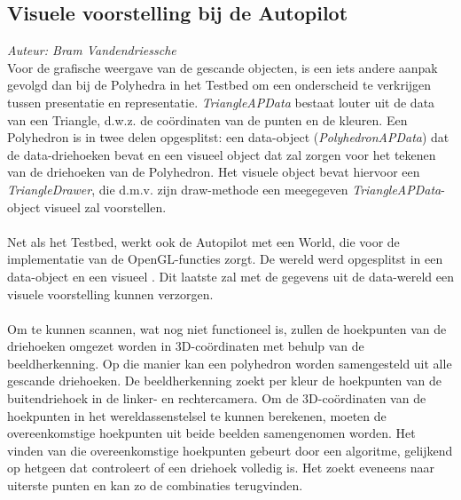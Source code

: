 \subsection{Visuele voorstelling bij de Autopilot}
{\em Auteur: Bram Vandendriessche}\\

\noindent
Voor de grafische weergave van de gescande objecten, is een iets andere aanpak gevolgd dan bij de Polyhedra in het Testbed om een onderscheid te verkrijgen tussen presentatie en representatie. \textit{TriangleAPData} bestaat louter uit de data van een Triangle, d.w.z. de co\"ordinaten van de punten en de kleuren. Een Polyhedron is in twee delen opgesplitst: een data-object (\textit{PolyhedronAPData}) dat de data-driehoeken bevat en een visueel object dat zal zorgen voor het tekenen van de driehoeken van de Polyhedron. Het visuele object bevat hiervoor een \textit{TriangleDrawer}, die d.m.v. zijn draw-methode een meegegeven \textit{TriangleAPData}-object visueel zal voorstellen.\\
\\
Net als het Testbed, werkt ook de Autopilot met een World, die voor de implementatie van de OpenGL-functies zorgt. De wereld werd opgesplitst in een data-object en een visueel %
. Dit laatste zal met de gegevens uit de data-wereld een visuele voorstelling kunnen verzorgen.\\ %
\\
Om te kunnen scannen, wat nog niet functioneel is, zullen de hoekpunten van de driehoeken omgezet worden in 3D-co\"ordinaten met behulp van de beeldherkenning. Op die manier kan een polyhedron worden samengesteld uit alle gescande driehoeken. De beeldherkenning zoekt per kleur de hoekpunten van de buitendriehoek in de linker- en rechtercamera. Om de 3D-co\"ordinaten van de hoekpunten in het wereldassenstelsel te kunnen berekenen, moeten de overeenkomstige hoekpunten uit beide beelden samengenomen worden. Het vinden van die overeenkomstige hoekpunten gebeurt door een algoritme, gelijkend op hetgeen dat controleert of een driehoek volledig is. Het zoekt eveneens naar uiterste punten en kan zo de combinaties terugvinden.  